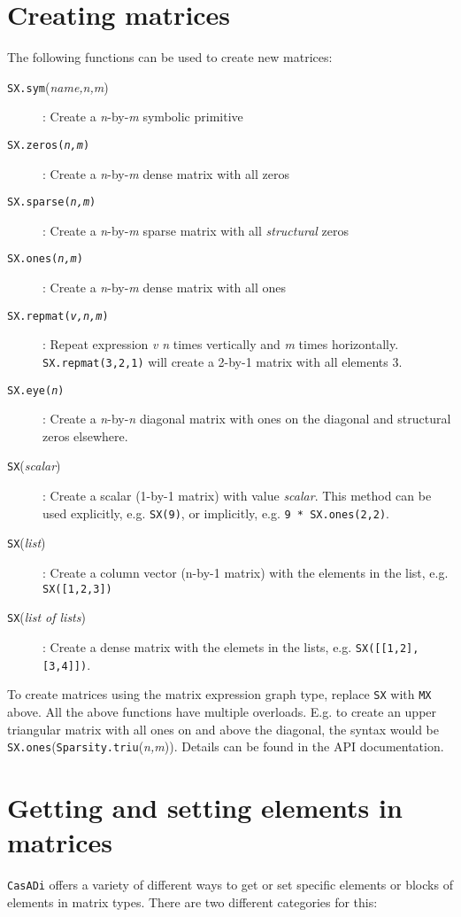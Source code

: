 \documentclass[a4paper,12pt]{book}
\newcommand{\CasADi}{\texttt{CasADi}\xspace}
\begin{document}
\section{Creating matrices}
The following functions can be used to create new matrices:
\begin{description}
  \item[\texttt{SX.sym}(\emph{name,n,m})]: Create a \emph{n}-by-\emph{m} symbolic primitive
  \item[\texttt{SX.zeros(\emph{n,m})}]: Create a \emph{n}-by-\emph{m} dense matrix with all zeros
  \item[\texttt{SX.sparse(\emph{n,m})}]: Create a \emph{n}-by-\emph{m} sparse matrix with all \emph{structural} zeros
  \item[\texttt{SX.ones(\emph{n,m})}]: Create a \emph{n}-by-\emph{m} dense matrix with all ones
  \item[\texttt{SX.repmat(\emph{v,n,m})}]: Repeat expression \emph{v} \emph{n} times vertically and \emph{m} times horizontally. \verb|SX.repmat(3,2,1)| will create a 2-by-1 matrix with all elements 3.
  \item[\texttt{SX.eye(\emph{n})}]: Create a \emph{n}-by-\emph{n} diagonal matrix with ones on the diagonal and structural zeros elsewhere.
  \item[\texttt{SX}(\emph{scalar})]: Create a scalar (1-by-1 matrix) with value \emph{scalar}. This method can be used explicitly, e.g. \verb|SX(9)|, or implicitly, e.g. \verb|9 * SX.ones(2,2)|.
  \item[\texttt{SX}(\emph{list})]: Create a column vector (n-by-1 matrix) with the elements in the list, e.g. \verb|SX([1,2,3])|
  \item[\texttt{SX}(\emph{list of lists})]: Create a dense matrix with the elemets in the lists, e.g. \verb|SX([[1,2],[3,4]])|.
\end{description}

To create matrices using the matrix expression graph type, replace \texttt{SX} with \texttt{MX} above. All the above functions have multiple overloads. E.g. to create an upper triangular matrix with all ones on and above the diagonal, the syntax would be \texttt{SX.ones}(\texttt{Sparsity.triu}(\emph{n,m})). Details can be found in the API documentation.

\section{Getting and setting elements in matrices}
\CasADi offers a variety of different ways to get or set specific elements or blocks of elements in matrix types. There are two different categories for this:
\end{document}
